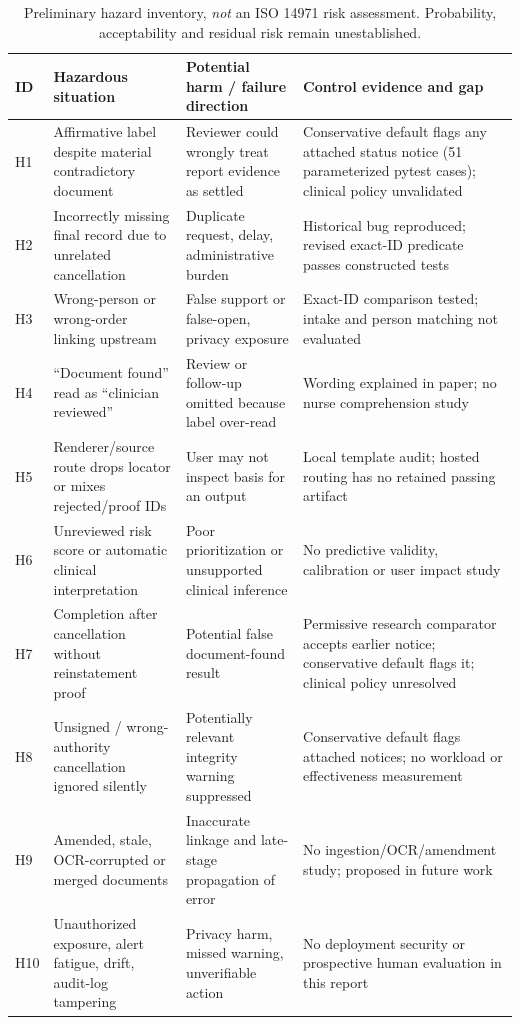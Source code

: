 \documentclass[11pt,twocolumn]{article}
\begin{document}
\begin{table}[t]\centering\scriptsize\caption{Preliminary hazard inventory, \emph{not} an ISO 14971 risk assessment. Probability, acceptability and residual risk remain unestablished.}\label{tab:hazards}
\begin{tabular}{@{}p{}p{}p{}p{}@{}}\toprule
ID & Hazardous situation & Potential harm / failure direction & Control evidence and gap \\\midrule
H1 & Affirmative label despite material contradictory document & Reviewer could wrongly treat report evidence as settled & Conservative default flags any attached status notice (51 parameterized pytest cases); clinical policy unvalidated \\
H2 & Incorrectly missing final record due to unrelated cancellation & Duplicate request, delay, administrative burden & Historical bug reproduced; revised exact-ID predicate passes constructed tests \\
H3 & Wrong-person or wrong-order linking upstream & False support or false-open, privacy exposure & Exact-ID comparison tested; intake and person matching not evaluated \\
H4 & ``Document found'' read as ``clinician reviewed'' & Review or follow-up omitted because label over-read & Wording explained in paper; no nurse comprehension study \\
H5 & Renderer/source route drops locator or mixes rejected/proof IDs & User may not inspect basis for an output & Local template audit; hosted routing has no retained passing artifact \\
H6 & Unreviewed risk score or automatic clinical interpretation & Poor prioritization or unsupported clinical inference & No predictive validity, calibration or user impact study \\
H7 & Completion after cancellation without reinstatement proof & Potential false document-found result & Permissive research comparator accepts earlier notice; conservative default flags it; clinical policy unresolved \\
H8 & Unsigned / wrong-authority cancellation ignored silently & Potentially relevant integrity warning suppressed & Conservative default flags attached notices; no workload or effectiveness measurement \\
H9 & Amended, stale, OCR-corrupted or merged documents & Inaccurate linkage and late-stage propagation of error & No ingestion/OCR/amendment study; proposed in future work \\
H10 & Unauthorized exposure, alert fatigue, drift, audit-log tampering & Privacy harm, missed warning, unverifiable action & No deployment security or prospective human evaluation in this report \\\bottomrule
\end{tabular}
\end{table}
\end{document}
